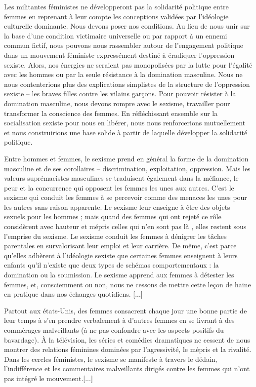 Les militantes féministes ne développeront pas la solidarité politique entre femmes en reprenant à leur compte les conceptions validées par l'idéologie culturelle dominante.
Nous devons poser nos conditions.
Au lieu de nous unir sur la base d'une condition victimaire universelle ou par rapport à un ennemi commun fictif, nous pouvons nous rassembler autour de l'engagement politique dans un mouvement féministe expressément destiné à éradiquer l'oppression sexiste.
Alors, nos énergies ne seraient pas monopolisées par la lutte pour l'égalité avec les hommes ou par la seule résistance à la domination masculine.
Nous ne nous contenterions plus des explications simplistes de la structure de l'oppression sexiste -- les braves filles contre les vilains garçons.
Pour pouvoir résister à la domination masculine, nous devons rompre avec le sexisme, travailler pour transformer la conscience des femmes.
En réfléchissant ensemble sur la socialisation sexiste pour nous en libérer, nous nous renforcerions mutuellement et nous construirions une base solide à partir de laquelle développer la solidarité politique.
\bigskip

Entre hommes et femmes, le sexisme prend en général la forme de la domination masculine et de ses corollaires -- discrimination, exploitation, oppression.
Mais les valeurs suprémacistes masculines se traduisent également dans la méfiance, le peur et la concurrence qui opposent les femmes les unes aux autres.
C'est le sexisme qui conduit les femmes à se percevoir comme des menaces les unes pour les autres sans raison apparente.
Le sexisme leur enseigne à être des objets sexuels pour les hommes ; mais quand des femmes qui ont rejeté ce rôle considèrent avec hauteur et mépris celles qui \og n'en sont pas là \fg, elles restent sous l'emprise du sexisme.
Le sexisme conduit les femmes à dénigrer les tâches parentales en survalorisant leur emploi et leur carrière.
De même, c'est parce qu'elles adhèrent à l'idéologie sexiste que certaines femmes enseignent à leurs enfants qu'il n'existe que deux types de schémas comportementaux : la domination ou la soumission.
Le sexisme apprend aux femmes à détester les femmes, et, consciemment ou non, nous ne cessons de mettre cette leçon de haine en pratique dans nos échanges quotidiens. [...]
\bigskip

Partout aux états-Unis, des femmes consacrent chaque jour une bonne partie de leur temps à s'en prendre verbalement à d'autres femmes en se livrant à des commérages malveillants (à ne pas confondre avec les aspects positifs du bavardage).
À la télévision, les séries et comédies dramatiques ne cessent de nous montrer des relations féminines dominées par l'agressivité, le mépris et la rivalité.
Dans les cercles féministes, le sexisme se manifeste à travers le dédain, l'indifférence et les commentaires malveillants dirigés contre les femmes qui n'ont pas intégré le mouvement.[...]
\bigskip

